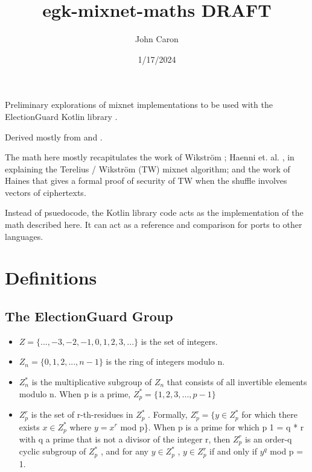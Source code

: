 \documentclass{article}
\title{egk-mixnet-maths DRAFT}
\author{John Caron}
\date{1/17/2024}
\begin{document}
\maketitle

Preliminary explorations of mixnet implementations to be used with
the ElectionGuard Kotlin library \cite{Caron23}. \par

Derived mostly from \cite{Verificatum} and \cite{Wikstr22}.

The math here mostly recapitulates the work of Wikström \cite{Wikstr22}; Haenni
et. al. \cite{Haenni23} \cite{Haenni17}, in explaining the Terelius / Wikström (TW)
mixnet algorithm\cite{Wikstr10}\cite{Wikstr09}; and the work of Haines \cite{Haines19}
that gives a formal proof of security of TW when the shuffle involves
vectors of ciphertexts. \par

Instead of psuedocode, the Kotlin library code acts as the implementation
of the math described here. It can act as a reference and comparison
for ports to other languages. 

\pagebreak 
\tableofcontents
\pagebreak 

\section{Definitions}

\subsection{The ElectionGuard Group}
\begin{itemize}
\item $Z=\{...,-3,-2,-1,0,1,2,3,...\}$ is the set of integers. 
\item $Z_{n}=\{0,1,2,...,n-1\}$ is the ring of integers modulo n. 
\item $Z_{n}^{*}$ is the multiplicative subgroup of $Z_{n}$ that consists
of all invertible elements modulo n. When p is a prime, $Z_{p}^{*}=\{1,2,3,...,p-1\}$ 
\item $Z_{p}^{r}$ is the set of r-th-residues in $Z_{p}^{*}$ . Formally,
$Z_{p}^{r}=\{y\in Z_{p}^{*}$ for which there exists $x\in Z_{p}^{*}$
where $y=x^{r}$ mod p\}. When p is a prime for which p \textminus{}
1 = q {*} r with q a prime that is not a divisor of the integer r,
then $Z_{p}^{r}$ is an order-q cyclic subgroup of $Z_{p}^{*}$ ,
and for any $y\in Z_{p}^{*}$ , $y\in Z_{p}^{r}$ if and only if $y^{q}$
mod p = 1. 
\end{itemize}
\end{document}
